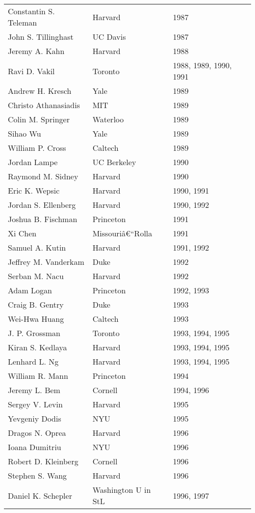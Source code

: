 \documentclass[12pt]{article}
\begin{document}
\begin{tabular}{|l|l|l|}
Constantin S. Teleman & Harvard & 1987 \\
John S. Tillinghast & UC Davis & 1987 \\
Jeremy A. Kahn & Harvard & 1988 \\
Ravi D. Vakil & Toronto & 1988, 1989, 1990, 1991 \\
Andrew H. Kresch & Yale & 1989 \\
Christo Athanasiadis & MIT & 1989 \\
Colin M. Springer & Waterloo & 1989 \\
Sihao Wu & Yale & 1989 \\
William P. Cross & Caltech & 1989 \\
Jordan Lampe & UC Berkeley & 1990 \\
Raymond M. Sidney & Harvard & 1990 \\
Eric K. Wepsic & Harvard & 1990, 1991 \\
Jordan S. Ellenberg & Harvard & 1990, 1992 \\
Joshua B. Fischman & Princeton & 1991 \\
Xi Chen & Missouriâ€“Rolla & 1991 \\
Samuel A. Kutin & Harvard & 1991, 1992 \\
Jeffrey M. Vanderkam & Duke & 1992 \\
Serban M. Nacu & Harvard & 1992 \\
Adam Logan & Princeton & 1992, 1993 \\
Craig B. Gentry & Duke & 1993 \\
Wei-Hwa Huang & Caltech & 1993 \\
J. P. Grossman & Toronto & 1993, 1994, 1995 \\
Kiran S. Kedlaya & Harvard & 1993, 1994, 1995 \\
Lenhard L. Ng & Harvard & 1993, 1994, 1995 \\
William R. Mann & Princeton & 1994 \\
Jeremy L. Bem & Cornell & 1994, 1996 \\
Sergey V. Levin & Harvard & 1995 \\
Yevgeniy Dodis & NYU & 1995 \\
Dragos N. Oprea & Harvard & 1996 \\
Ioana Dumitriu & NYU & 1996 \\
Robert D. Kleinberg & Cornell & 1996 \\
Stephen S. Wang & Harvard & 1996 \\
Daniel K. Schepler & Washington U in StL & 1996, 1997 \\

\end{tabular}
\end{document}
